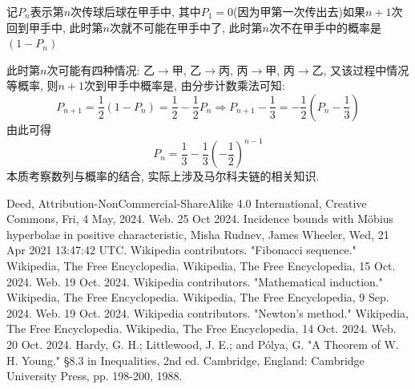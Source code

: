 \documentclass{book}
\begin{document}
    记$P_n$表示第$n$次传球后球在甲手中, 其中$P_1=0$(因为甲第一次传出去)如果$n+1$次回到甲手中, 此时第$n$次就不可能在甲手中了, 此时\textcolor[rgb]{0.75,0.17,0.22}{第$n$次不在甲手中的概率是$(1-P_n)$}

    此时第$n$次可能有四种情况: 乙$\rightarrow$甲, 乙$\rightarrow$丙, 丙$\rightarrow$甲, 丙$\rightarrow$乙, 又该过程中情况等概率, 则$n+1$次到甲手中概率是, 由分步计数乘法可知:$$P_{n+1}=\frac{1}{2}\left( 1-P_n \right)=\frac{1}{2}-\frac{1}{2}P_n\Longrightarrow P_{n+1}-\frac{1}{3}=-\frac{1}{2}\left( P_n-\frac{1}{3} \right)$$由此可得$$P_n=\frac{1}{3}-\frac{1}{3}\left( -\frac{1}{2} \right)^{n-1}$$
    本质考察数列与概率的结合, 实际上涉及\textcolor[rgb]{0.38,0.11,0.2}{马尔科夫链}的相关知识. 

    \begin{thebibliography}{99}
        Deed, Attribution-NonCommercial-ShareAlike 4.0 International, Creative Commons, Fri, 4 May, 2024. Web. 25 Oct 2024.
        Incidence bounds with Möbius hyperbolae in positive characteristic, Misha Rudnev, James Wheeler, Wed, 21 Apr 2021 13:47:42 UTC.
        Wikipedia contributors. "Fibonacci sequence." Wikipedia, The Free Encyclopedia. Wikipedia, The Free Encyclopedia, 15 Oct. 2024. Web. 19 Oct. 2024.
        Wikipedia contributors. "Mathematical induction." Wikipedia, The Free Encyclopedia. Wikipedia, The Free Encyclopedia, 9 Sep. 2024. Web. 19 Oct. 2024.
        Wikipedia contributors. "Newton's method." Wikipedia, The Free Encyclopedia. Wikipedia, The Free Encyclopedia, 14 Oct. 2024. Web. 20 Oct. 2024.
        Hardy, G. H.; Littlewood, J. E.; and Pólya, G. "A Theorem of W. H. Young." §8.3 in Inequalities, 2nd ed. Cambridge, England: Cambridge University Press, pp. 198-200, 1988.
    \end{thebibliography}
\end{document}
